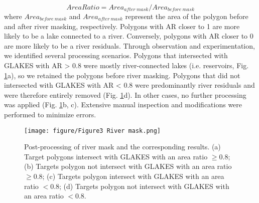 \documentclass[preprint,12pt,authoryear]{elsarticle}
\begin{document}
\begin{equation}
Area Ratio = Area_{after\ mask}/Area_{before\ mask}
\end{equation}
where $Area_{before\ mask}$ and $Area_{after\ mask}$ represent the area of the polygon before and after river masking, respectively. Polygons with AR closer to 1 are more likely to be a lake connected to a river. Conversely, polygons with AR closer to 0 are more likely to be a river residuals. Through observation and experimentation, we identified several processing scenarios. Polygons that intersected with GLAKES with AR > 0.8 were mostly river-connected lakes (i.e. reservoirs, Fig. \ref{fig:Fig3}a), so we retained the polygons before river masking. Polygons that did not intersected with GLAKES with AR < 0.8 were predominantly river residuals and were therefore entirely removed (Fig. \ref{fig:Fig3}d). In other cases, no further processing was applied (Fig. \ref{fig:Fig3}b, c). Extensive manual inspection and modifications were performed to minimize errors.

\begin{figure}[h]
    \centering
    \texttt{[image: figure/Figure3 River mask.png]}
    \caption{Post-processing of river mask and the corresponding results. (a) Target polygons intersect with GLAKES with an area ratio $\geq$0.8; (b) Targets polygon not intersect with GLAKES with an area ratio $\geq$0.8; (c) Targets polygon intersect with GLAKES with an area ratio $<$0.8; (d) Targets polygon not intersect with GLAKES with an area ratio $<$0.8.}
    \label{fig:Fig3}
\end{figure}
\end{document}
